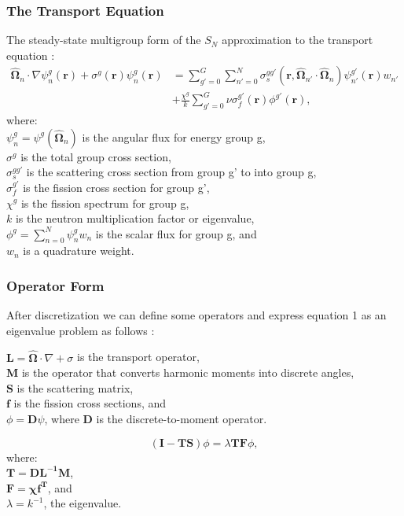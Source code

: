 \documentclass{beamer}
\begin{document}
\begin{frame}
  \frametitle{The Transport Equation}

The steady-state multigroup form of the $S_{N}$ approximation to the transport equation \cite{Den}:
\begin{align}
   \mathbf{\hat{\Omega}}_{n} \cdot \nabla \psi^{g}_{n}(\mathbf{r}) + \sigma^{g} (\mathbf{r}) \psi^{g}_{n}(\mathbf{r}) &= \sum_{g'=0}^{G}  \sum_{n'=0}^{N} \sigma_{s}^{gg'}(\mathbf{r}, \mathbf{\hat{\Omega}}_{n'} \cdot \mathbf{\hat{\Omega}}_{n}) \psi^{g'}_{n'}(\mathbf{r}) w_{n'} \nonumber \\
&+ \frac{\chi^{g}}{k} \sum_{g'=0}^{G} \nu \sigma_{f}^{g'}(\mathbf{r})\phi^{g'}(\mathbf{r}),
\end{align}
where: \\
\indent $\psi^{g}_{n} = \psi^{g}(\mathbf{\hat{\Omega}}_{n})$ is the angular flux for energy group g, \\
\indent $\sigma^{g}$ is the total group cross section, \\
\indent $\sigma^{gg'}_{s}$ is the scattering cross section from group g' to into group g, \\
\indent $\sigma^{g'}_{f}$ is the fission cross section for group g', \\
\indent $\chi^{g}$ is the fission spectrum for group g, \\
\indent $k$ is the neutron multiplication factor or eigenvalue, \\
\indent $\phi^{g} = \sum_{n=0}^{N} \psi^{g}_{n} w_{n}$ is the scalar flux for group g, and \\
\indent $w_{n}$ is a quadrature weight. \\
  
\end{frame}

\begin{frame}
  \frametitle{Operator Form}
After discretization we can define some operators and express equation 1 as an eigenvalue problem as follows \cite{Den}:

\indent $\mathbf{L} = \mathbf{\hat{\Omega}} \cdot \nabla + \sigma$ is the transport operator, \\
\indent $\mathbf{M}$ is the operator that converts harmonic moments into discrete angles, \\
\indent $\mathbf{S}$ is the scattering matrix, \\
\indent $\mathbf{f}$ is the fission cross sections, and \\
\indent $\phi = \mathbf{D}\psi$, where $\mathbf{D}$ is the discrete-to-moment operator. 

 
\begin{equation}
  (\mathbf{I} - \mathbf{TS}) \phi = \lambda\mathbf{TF}\phi,
\end{equation}
where: \\ 
\indent $\mathbf{T} =  \mathbf{DL^{-1}M}$, \\
\indent $\mathbf{F} = \boldsymbol{\chi}\mathbf{f^{T}}$, and \\
\indent $\lambda = k^{-1}$, the eigenvalue. 

\end{frame}
\end{document}
